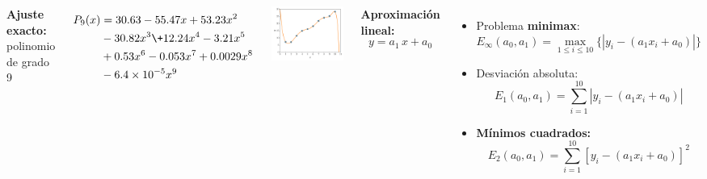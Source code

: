 \documentclass[9pt, aspectratio=169]{beamer}
\begin{document}
\begin{frame}
\begin{columns}[t]
\textbf{Ajuste exacto:} polinomio de grado 9

\begin{align*}
    P_{9}(x) &= 30.63 - 55.47 x + 53.23 x^2 \\
             &- 30.82 x^3 \+ 12.24 x^4 -3.21 x^5 \\
             & +0.53 x^6 - 0.053 x^7 + 0.0029 x^8 \\
             &- 6.4 \times 10^{-5} x^9
\end{align*}
\begin{center}
    \includegraphics[scale=0.40]{figs/fig-02.pdf}
\end{center} \pause

\textbf{Aproximación lineal:}
\[ y = a_1 \, x + a_0 \]

\begin{itemize}
    \item  Problema \textbf{minimax}: 
        \[ E_{\infty}(a_0, a_1) = \max_{1 \leq i \leq 10} \{|y_i - (a_1 x_i + a_0)|\} \]  \pause
    \item Desviación absoluta: 
        \[ E_1(a_0, a_1) = \sum_{i = 1}^{10} |y_i - (a_1 x_i + a_0) | \] \pause
    \item \textbf{Mínimos cuadrados:}
    \[ E_2(a_0, a_1) = \sum_{i = 1}^{10} [y_i - (a_1 x_i + a_0)]^2 \]
\end{itemize}
\end{columns}
\end{frame}
\end{document}
